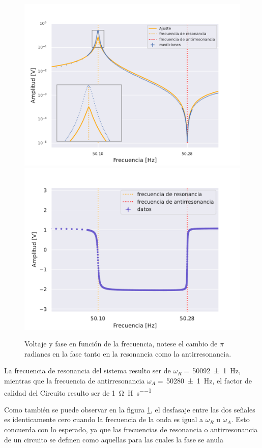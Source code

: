 \documentclass{article}
\begin{document}
\begin{figure}[H]
    \centering
    \includegraphics[width=0.8\linewidth]{amp.pdf}
    \includegraphics[width=0.8\linewidth]{phas.pdf}
    \caption{Voltaje y fase en función de la frecuencia, notese el cambio de
    $\pi$ radianes en la fase tanto en la resonancia como la antirresonancia.}
    \label{fig:voltaje y fase lock in}
\end{figure}

La frecuencia de resonancia del sistema resulto ser de
$\omega_R=$\,\SI{50092(1)}{\hertz}, mientras que la frecuencia de antirresonancia $\omega_A=$\,\SI{50280(1)}{\hertz}, el factor de calidad del Circuito
resulto ser de \SI{1}{\ohm \per \henry \per \second}

Como también se puede observar en la figura \ref{fig:voltaje y fase lock in},
el desfasaje entre las dos señales es identicamente cero cuando la frecuencia
de la onda es igual a $\omega_R$ u $\omega_A$. Esto concuerda con lo esperado,
ya que las frecuencias de resonancia o antirresonancia de un circuito se
definen como aquellas para las cuales la fase se anula
\end{document}
